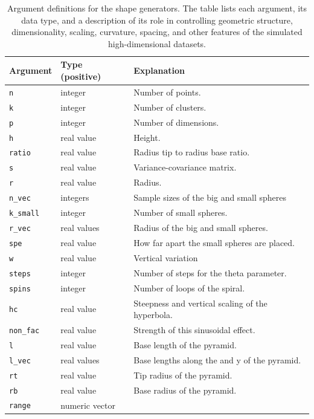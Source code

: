 \begin{table}

\caption{\label{tab:arg-shape-tb-pdf}Argument definitions for the shape generators. The table lists each argument, its data type, and a description of its role in controlling geometric structure, dimensionality, scaling, curvature, spacing, and other features of the simulated high-dimensional datasets.}
\centering
\begin{tabular}[t]{>{\raggedright\arraybackslash}p{2cm}>{\raggedright\arraybackslash}p{3cm}l}
\toprule
Argument & Type (positive) & Explanation\\
\midrule
\texttt{n} & integer & Number of points.\\
\texttt{k} & integer & Number of clusters.\\
\texttt{p} & integer & Number of dimensions.\\
\texttt{h} & real value & Height.\\
\texttt{ratio} & real value & Radius tip to radius base ratio.\\
\addlinespace
\texttt{s} & real value & Variance-covariance matrix.\\
\texttt{r} & real value & Radius.\\
\texttt{n\_vec} & integers & Sample sizes of the big and small spheres\\
\texttt{k\_small} & integer & Number of small spheres.\\
\texttt{r\_vec} & real values & Radius of the big and small spheres.\\
\addlinespace
\texttt{spe} & real value & How far apart the small spheres are placed.\\
\texttt{w} & real value & Vertical variation\\
\texttt{steps} & integer & Number of steps for the theta parameter.\\
\texttt{spins} & integer & Number of loops of the spiral.\\
\texttt{hc} & real value & Steepness and vertical scaling of the hyperbola.\\
\addlinespace
\texttt{non\_fac} & real value & Strength of this sinusoidal effect.\\
\texttt{l} & real value & Base length of the pyramid.\\
\texttt{l\_vec} & real values & Base lengths along the and y of the pyramid.\\
\texttt{rt} & real value & Tip radius of the pyramid.\\
\texttt{rb} & real value & Base radius of the pyramid.\\
\addlinespace
\texttt{range} & numeric vector & \\
\bottomrule
\end{tabular}
\end{table}

